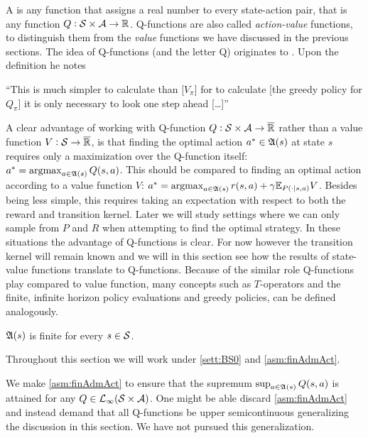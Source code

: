 A  is any function that assigns a real number
to every state-action pair, that is any function $Q : \mathcal{S} \times \mathcal{A}
\to \mathbb{R}$. Q-functions are also called \emph{action-value} functions,
to distinguish them from the \emph{value} functions we have discussed in the
previous sections.
The idea of Q-functions (and the letter Q) originates to
. Upon the definition he notes
\begin{displayquote}
  ``This is much simpler to calculate than [$V_\pi$]
  for to calculate [the greedy policy for $Q_\pi$] it is only necessary to look one
  step ahead [\ldots]''
\end{displayquote}
A clear advantage of working with Q-function
$Q:\mathcal{S}\times\mathcal{A} \to \overline{\mathbb{R}}$ rather than a value function
$V:\mathcal{S}\to \overline{\mathbb{R}}$,
is that finding the optimal action $a^* \in \frak{A}(s)$ at state $s$
requires only a maximization over the Q-function itself:
$a^* = \operatorname*{argmax}_{a \in \frak{A}(s)} Q(s,a)$.
This should be compared to finding an optimal action
according to a value function $V$:
$a^* = \operatorname*{argmax}_{a \in \frak{A}(s)} r(s,a) + \gamma \mathbb{E}_{P(\cdot \mid s,a)} V$.
Besides being less simple,
this requires taking an expectation with respect to 
both the reward and transition kernel.
Later we will study settings where we can only sample from $P$ and $R$
when attempting to find the optimal strategy.
In these situations the advantage of Q-functions is clear.
For now however the transition kernel will remain known and we
will in this section see how the results of state-value functions
translate to Q-functions.
Because of the similar role Q-functions play compared to value function,
many concepts such as $T$-operators and the finite, infinite horizon
policy evaluations and greedy policies, can be defined analogously.

\begin{asm}
  $\frak{A}(s)$ is finite for every $s \in \mathcal{S}$. 
  \label{asm:finAdmAct}
\end{asm}
Throughout this section we will work under
\cref{sett:BS0} and \cref{asm:finAdmAct}.

\begin{rem}
  We make \cref{asm:finAdmAct} to ensure that the supremum
  $\sup_{a \in \frak{A}(s)} Q(s, a)$ is attained for any
  $Q \in \mathcal{L}_\infty(\mathcal{S} \times \mathcal{A})$.
  One might be able discard \cref{asm:finAdmAct} and instead
  demand that all Q-functions be
  upper semicontinuous generalizing the discussion in this section.
  We have not pursued this generalization.
\end{rem}

